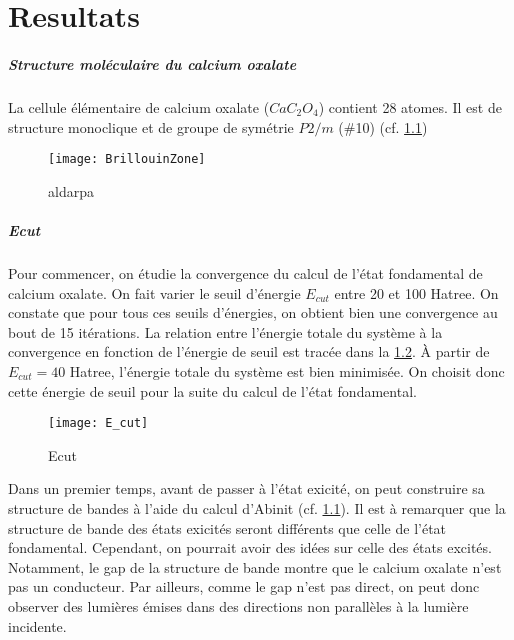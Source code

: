 \chapter{Resultats}
\label{chap-results}

\paragraph{Structure moléculaire du calcium oxalate}
La cellule élémentaire de calcium oxalate ($Ca C_2 O_4$) contient 28 atomes. Il est de structure monoclique et de groupe de symétrie $P2/m$ ($\#$10) (cf. \cref{BrillouinZone})

\begin{figure}[!h]\label{BrillouinZone}
    \centering
    \texttt{[image: BrillouinZone]}
    \caption{aldarpa}
\end{figure}
\paragraph{Ecut}
Pour commencer, on étudie la convergence du calcul de l'état fondamental de calcium oxalate. On fait varier le seuil d'énergie $E_{cut}$ entre 20 et 100 Hatree.
On constate que pour tous ces seuils d'énergies, on obtient bien une convergence au bout de 15 itérations. La relation entre l'énergie totale du système à la convergence en fonction de l'énergie de seuil est tracée dans la \cref{Ecut}.
À partir de $E_{cut} = 40$ Hatree, l'énergie totale du système est bien minimisée. On choisit donc cette énergie de seuil pour la suite du calcul de l'état fondamental.

\begin{figure}[!h]\label{Ecut}
    \centering
    \texttt{[image: E\_cut]}
    \caption{Ecut}
\end{figure}


Dans un premier temps, avant de passer à l'état exicité, on peut construire sa structure de bandes à l'aide du calcul d'Abinit (cf. \cref{BrillouinZone}).
Il est à remarquer que la structure de bande des états exicités seront différents que celle de l'état fondamental.
Cependant, on pourrait avoir des idées sur celle des états excités.
Notamment, le gap de la structure de bande montre que le calcium oxalate n'est pas un conducteur.
Par ailleurs, comme le gap n'est pas direct, on peut donc observer des lumières émises dans des directions non parallèles à la lumière incidente.

